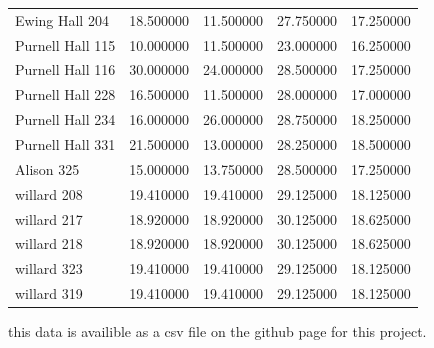 \documentclass[conference]{IEEEtran}
\begin{document}
\begin{tabular}{l|r|r|r|r}
    Ewing Hall 204 & 18.500000 & 11.500000 & 27.750000 & 17.250000 \\
    Purnell Hall 115 & 10.000000 & 11.500000 & 23.000000 & 16.250000 \\
    Purnell Hall 116 & 30.000000 & 24.000000 & 28.500000 & 17.250000 \\
    Purnell Hall 228 & 16.500000 & 11.500000 & 28.000000 & 17.000000 \\
    Purnell Hall 234 & 16.000000 & 26.000000 & 28.750000 & 18.250000 \\
    Purnell Hall 331 & 21.500000 & 13.000000 & 28.250000 & 18.500000 \\
    Alison 325 & 15.000000 & 13.750000 & 28.500000 & 17.250000 \\
    willard 208 & 19.410000 & 19.410000 & 29.125000 & 18.125000 \\
    willard 217 & 18.920000 & 18.920000 & 30.125000 & 18.625000 \\
    willard 218 & 18.920000 & 18.920000 & 30.125000 & 18.625000 \\
    willard 323 & 19.410000 & 19.410000 & 29.125000 & 18.125000 \\
    willard 319 & 19.410000 & 19.410000 & 29.125000 & 18.125000 \\
    \bottomrule
\end{tabular}   

\vspace{1em}
this data is availible as a csv file on the github page for this project.
\twocolumn
\clearpage
\end{document}
